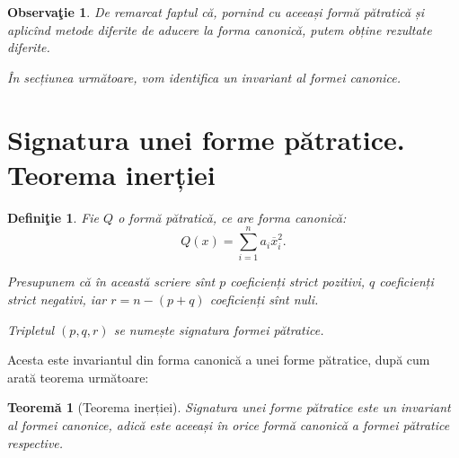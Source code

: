 \documentclass[11pt,a4paper]{article}
\theoremstyle{dotless}
\newtheorem{theorem}{Teorem\u{a}}[section]
\theoremstyle{dotlessdr}
\newtheorem{definition}{Defini\c{t}ie}[section]
\newtheorem{remark}{Observa\c{t}ie}[section]
\begin{document}
\begin{remark}
	De remarcat faptul că, pornind cu aceeași formă pătratică și aplicînd metode
diferite de aducere la forma canonică, putem obține rezultate diferite.

În secțiunea următoare, vom identifica un invariant al formei canonice.
\end{remark}


\section{Signatura unei forme pătratice. Teorema inerției}

\begin{definition}
	Fie $Q$ o formă pătratică, ce are forma canonică: 
 \[
	Q(x) = \sum_{i = 1}^n a_i \overline{x}_i^2.
\]

Presupunem că în această scriere sînt $p$ coeficienți strict pozitivi, $q$
coeficienți strict negativi, iar $r = n - (p + q)$ coeficienți sînt nuli.

Tripletul $(p, q, r)$ se numește \emph{signatura formei pătratice}.
\end{definition}

Acesta este invariantul din forma canonică a unei forme pătratice, după cum
arată teorema următoare:

\begin{theorem}[Teorema inerției]
	Signatura unei forme pătratice este un invariant al formei canonice, adică
este aceeași în orice formă canonică a formei pătratice respective.
\end{theorem}
\end{document}
